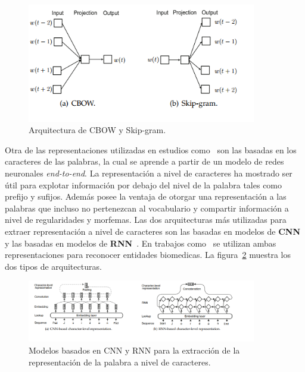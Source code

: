 \begin{figure}[h!]
	\centering
	\includegraphics[width = 10cm]{Imagenes/CBOW_SkipGram.png}
	\caption{Arquitectura de CBOW y Skip-gram.}\label{fig:cbowSkip}
\end{figure}


Otra de las representaciones utilizadas en estudios como~\cite{li2018segbot} son las basadas en los caracteres de las palabras, la cual se aprende a partir de un modelo de redes neuronales \emph{end-to-end}. La representaci\'on a nivel de caracteres ha mostrado ser \'util para explotar informaci\'on por debajo del nivel de la palabra tales como prefijo y sufijos. Adem\'as posee la ventaja de otorgar una representaci\'on a las palabras que incluso no pertenezcan al vocabulario y compartir informaci\'on a nivel de regularidades y morfemas. Las dos arquitecturas m\'as utilizadas para extraer representaci\'on a nivel de caracteres son las basadas en modelos de \textbf{CNN}~\cite{ma2016end} y las basadas en modelos de \textbf{RNN}~\cite{lample2016neural}. En trabajos como~\cite{gridach2017character} se utilizan ambas representaciones para reconocer entidades biomedicas. La figura~\ref{fig:charLevel} muestra los dos tipos de arquitecturas.

\begin{figure}[h!]
	\centering
	\includegraphics[width = 10cm]{Imagenes/charEmb.png}
	\caption{Modelos basados en CNN y RNN para la extracci\'on de la representaci\'on de la palabra a nivel de caracteres.}\label{fig:charLevel}
\end{figure}

